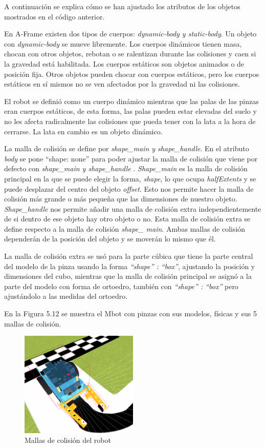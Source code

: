 A continuación se explica cómo se han ajustado los atributos de los objetos mostrados en el código anterior.

En A-Frame existen dos tipos de cuerpos: \textit{dynamic-body y static-body}. Un objeto con \textit{dynamic-body}  se mueve libremente. Los cuerpos dinámicos tienen masa, chocan con otros objetos, rebotan o se ralentizan durante las colisiones y caen si la gravedad está habilitada.
Los cuerpos estáticos son objetos animados o de posición fija. Otros objetos pueden chocar con cuerpos estáticos, pero los cuerpos estáticos en sí mismos no se ven afectados por la gravedad ni las colisiones.

El robot se definió como un cuerpo dinámico mientras que las palas de las pinzas eran cuerpos estáticos, de esta forma, las palas pueden estar elevadas del suelo y no les afecta  radicalmente las colisiones que pueda tener con la lata a la hora de cerrarse. La lata en cambio es un objeto dinámico.

La malla de colisión se define por \textit{shape\_main y shape\_handle}. En el atributo \textit{body} se pone ``shape: none'' para poder ajustar la malla de colisión que viene por defecto con \textit{shape\_main y shape\_handle} .
\textit{Shape\_main} es la malla de colisión principal en la que se puede elegir la forma, \textit{shape}, lo que ocupa \textit{halfExtents} y se puede desplazar del centro del objeto \textit{offset}. Esto nos permite hacer la malla de colisión más grande o más pequeña que las dimensiones de nuestro objeto. \textit{ Shape\_handle} nos permite añadir una malla de colisión extra independientemente de si dentro de ese  objeto hay otro objeto o no. Esta malla de colisión extra se define respecto a la malla de colisión \textit{shape\_ main}. Ambas mallas de colisión dependerán de la posición del objeto y se moverán lo mismo que él.

La malla de colisión extra se usó para la parte cúbica que tiene la parte central del modelo de la pinza usando la forma  \textit{ ``shape'' : ``box''},  ajustando  la posición y dimensiones del cubo, mientras que la malla de colisión principal se asignó a la parte del modelo con forma de ortoedro, también con \textit{ ``shape'' : ``box''} pero ajustándolo a las medidas del ortoedro.

En la Figura  5.12 se muestra el Mbot con pinzas con sus modelos, físicas y sus 5 mallas de colisión.

 \begin{figure}[H]
  \centering
 \includegraphics[width=0.5\textwidth, height=0.4\textwidth]{chapters/images/mallas.png}
  \caption{Mallas de colisión del robot}
\end{figure}

